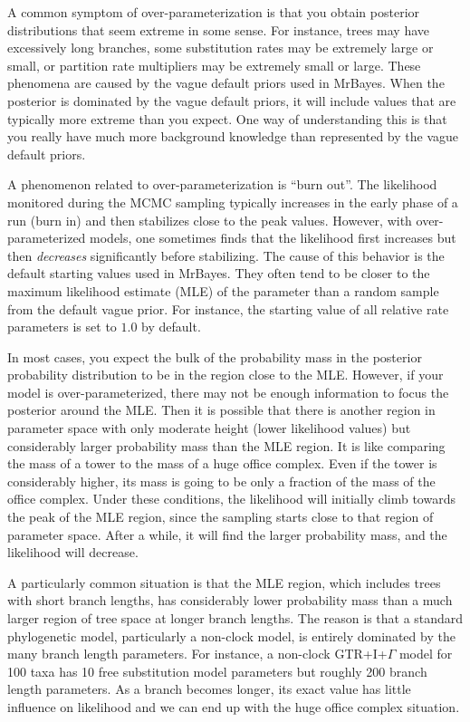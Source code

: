 \documentclass[12pt]{book}
\begin{document}
A common symptom of over-parameterization is that you obtain posterior distributions that seem
extreme in some sense. For instance, trees may have excessively long branches, some substitution
rates may be extremely large or small, or partition rate multipliers may be extremely small or
large. These phenomena are caused by the vague default priors used in MrBayes. When the posterior
is dominated by the vague default priors, it will include values that are typically more extreme
than you expect. One way of understanding this is that you really have much more background
knowledge than represented by the vague default priors.

A phenomenon related to over-parameterization is ``burn out''. The likelihood monitored during the
MCMC sampling typically increases in the early phase of a run (burn in) and then stabilizes close
to the peak values. However, with over-parameterized models, one sometimes finds that the
likelihood first increases but then \emph{decreases} significantly before stabilizing. The cause
of this behavior is the default starting values used in MrBayes. They often tend to be closer to
the maximum likelihood estimate (MLE) of the parameter than a random sample from the default vague
prior. For instance, the starting value of all relative rate parameters is set to $1.0$ by default.

In most cases, you expect the bulk of the probability mass in the posterior probability
distribution to be in the region close to the MLE. However, if your model is over-parameterized,
there may not be enough information to focus the posterior around the MLE. Then it is possible that
there is another region in parameter space with only moderate height (lower likelihood values) but
considerably larger probability mass than the MLE region. It is like comparing the mass of a tower
to the mass of a huge office complex. Even if the tower is considerably higher, its mass is going
to be only a fraction of the mass of the office complex. Under these conditions, the likelihood
will initially climb towards the peak of the MLE region, since the sampling starts close to that
region of parameter space. After a while, it will find the larger probability mass, and the
likelihood will decrease.

A particularly common situation is that the MLE region, which includes trees with short branch
lengths, has considerably lower probability mass than a much larger region of tree space at longer
branch lengths. The reason is that a standard phylogenetic model, particularly a non-clock model,
is entirely dominated by the many branch length parameters. For instance, a non-clock
GTR+I+$\Gamma$ model for 100 taxa has 10 free substitution model parameters but roughly 200 branch
length parameters. As a branch becomes longer, its exact value has little influence on likelihood
and we can end up with the huge office complex situation.
\end{document}
